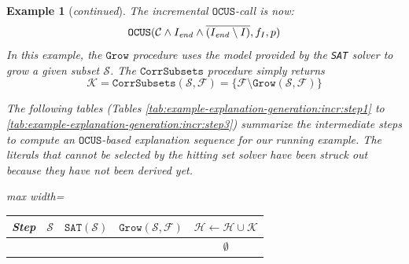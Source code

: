 \documentclass[twoside,11pt]{article}
\newcommand\m[1]{\mathcal{#1}}
\newtheorem{example}{Example}
\newcommand\comment[1]{\marginpar{\tiny #1}}
\renewcommand\comment[1]{#1}
\newcommand{\tias}[1]{{\comment{\color{blue}Tias:#1}}}
\newcommand\setstohit{\ensuremath{\m{H} }\xspace}
\newcommand\Iend{\ensuremath{I_\mathit{end} }\xspace}
\newcommand\formula{\ensuremath{\m{F} }\xspace}
\newcommand\formulac{\ensuremath{\m{C} }\xspace}
\newcommand\mm[1]{\ensuremath{#1}\xspace}
\newcommand\call[1]{\mm{\texttt{#1}}}
\newcommand\sat{\texttt{{SAT}}\xspace}
\newcommand\grow{\mm{\call{Grow}}}
\newcommand\comus{\mm{\call{OCUS}}}
\newcommand\corrsubsets{\mm{\call{CorrSubsets}}}
\begin{document}
\begin{example}[\textit{continued}]
	The incremental \comus-call is now: 	%
	\begin{equation}
	\comus( \formulac\land \textbf{\Iend} \land \overline{(\Iend\setminus I)}, f_I, p)		
	\end{equation}
	In this example, the $\grow$ procedure uses the model provided by the \sat solver to grow a given subset $\m{S}$. %
	The \corrsubsets procedure simply returns
	\begin{equation} 
		\m{K} = \corrsubsets(\m{S}, \formula) = \{\formula \setminus \grow(\m{S}, \formula)\}
			\end{equation}

 The following tables (Tables \ref{tab:example-explanation-generation:incr:step1} to \ref{tab:example-explanation-generation:incr:step3}) summarize the intermediate steps to compute an \comus-based explanation sequence for our running example. 
The literals that cannot be selected by the hitting set solver have been struck out because they have not been derived yet. 

\begin{table}[!ht]
	\centering
	\begin{adjustbox}{max width=\textwidth}
	\begin{tabular}{lcccc} 
		Step & $\m{S}$                             & $\sat(\m{S})$    &           \textit{$\grow(\m{S}, \formula)$}                     & $\setstohit  \gets \setstohit  \cup \m{K}$ \\ 
		\toprule[1pt]
		&    \phantom{$\{ c_1, c_2, x_1, \lnot x_3 \}$}    &    &      & $\emptyset$                                \\


\end{tabular}
\end{adjustbox}
\end{table}
\end{example}
\end{document}
